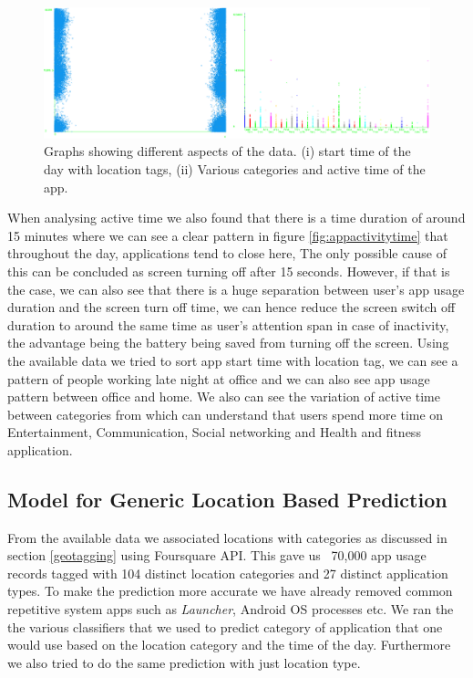 \documentclass[prodmode,acmtecs]{acmsmall}
\begin{document}
\begin{figure}[bhtp]
 \centering
 \includegraphics[width=120mm]{extra_graphs.png}
  \caption {Graphs showing different aspects of the data. (i) start time of the day with location tags, (ii) Various categories and active time of the app.}
 \label{fig:appextragraphs}
\end{figure}

When analysing active time we also found that there is a time duration of around 15 minutes where we can see a clear pattern in figure \ref{fig:appactivitytime} that throughout the day, applications tend to close here, The only possible cause of this can be concluded as screen turning off after 15 seconds. However, if that is the case, we can also see that there is a huge separation between user's app usage duration and the screen turn off time, we can hence reduce the screen switch off duration to around the same time as user's attention span in case of inactivity, the advantage being the battery being saved from turning off the screen. Using the available data we tried to sort app start time with location tag, we can see a pattern of people working late night at office and we can also see app usage pattern between office and home. We also can see the variation of active time between categories from which can understand that users spend more time on Entertainment, Communication, Social networking and Health and fitness application.

\subsection{Model for Generic Location Based Prediction}

From the available data we associated locations with categories as discussed in section \ref{geotagging} using Foursquare API. This gave us ~70,000 app usage records tagged with 104 distinct location categories and 27 distinct application types. To make the prediction more accurate we have already removed common repetitive system apps such as \textit{Launcher}, Android OS processes etc. We ran the the various classifiers that we used to predict category of application that one would use based on the location category and the time of the day. Furthermore we also tried to do the same prediction with just location type.
\end{document}
